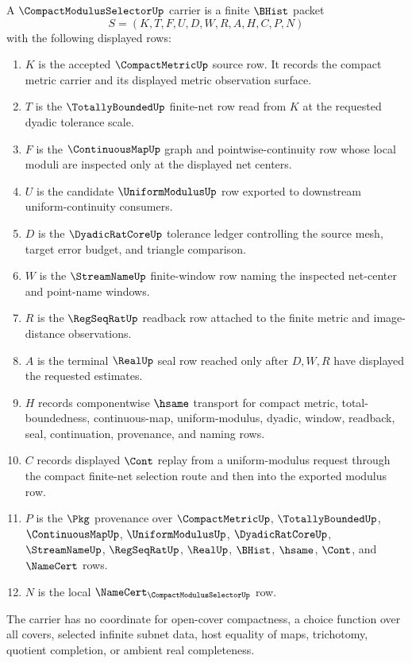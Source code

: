 \begin{definition}
\label{def:compact-modulus-selector-carrier}
A $\CompactModulusSelectorUp$ carrier is a finite $\BHist$ packet
$$
S=(K,T,F,U,D,W,R,A,H,C,P,N)
$$
with the following displayed rows:
\begin{enumerate}
\item $K$ is the accepted $\CompactMetricUp$ source row. It records the compact metric carrier and its displayed metric observation surface.
\item $T$ is the $\TotallyBoundedUp$ finite-net row read from $K$ at the requested dyadic tolerance scale.
\item $F$ is the $\ContinuousMapUp$ graph and pointwise-continuity row whose local moduli are inspected only at the displayed net centers.
\item $U$ is the candidate $\UniformModulusUp$ row exported to downstream uniform-continuity consumers.
\item $D$ is the $\DyadicRatCoreUp$ tolerance ledger controlling the source mesh, target error budget, and triangle comparison.
\item $W$ is the $\StreamNameUp$ finite-window row naming the inspected net-center and point-name windows.
\item $R$ is the $\RegSeqRatUp$ readback row attached to the finite metric and image-distance observations.
\item $A$ is the terminal $\RealUp$ seal row reached only after $D,W,R$ have displayed the requested estimates.
\item $H$ records componentwise $\hsame$ transport for compact metric, total-boundedness, continuous-map, uniform-modulus, dyadic, window, readback, seal, continuation, provenance, and naming rows.
\item $C$ records displayed $\Cont$ replay from a uniform-modulus request through the compact finite-net selection route and then into the exported modulus row.
\item $P$ is the $\Pkg$ provenance over $\CompactMetricUp$, $\TotallyBoundedUp$, $\ContinuousMapUp$, $\UniformModulusUp$, $\DyadicRatCoreUp$, $\StreamNameUp$, $\RegSeqRatUp$, $\RealUp$, $\BHist$, $\hsame$, $\Cont$, and $\NameCert$ rows.
\item $N$ is the local $\NameCert_{\CompactModulusSelectorUp}$ row.
\end{enumerate}
The carrier has no coordinate for open-cover compactness, a choice function over all covers, selected infinite subnet data, host equality of maps, trichotomy, quotient completion, or ambient real completeness.
\end{definition}


